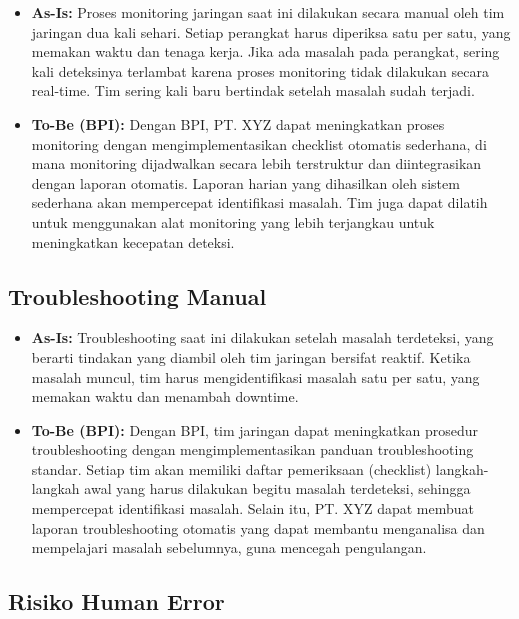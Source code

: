 \begin{itemize}
    \item \textbf{As-Is:} Proses monitoring jaringan saat ini dilakukan secara manual oleh tim jaringan dua kali sehari. Setiap perangkat harus diperiksa satu per satu, yang memakan waktu dan tenaga kerja. Jika ada masalah pada perangkat, sering kali deteksinya terlambat karena proses monitoring tidak dilakukan secara real-time. Tim sering kali baru bertindak setelah masalah sudah terjadi.

    \item \textbf{To-Be (BPI):} Dengan BPI, PT. XYZ dapat meningkatkan proses monitoring dengan mengimplementasikan checklist otomatis sederhana, di mana monitoring dijadwalkan secara lebih terstruktur dan diintegrasikan dengan laporan otomatis. Laporan harian yang dihasilkan oleh sistem sederhana akan mempercepat identifikasi masalah. Tim juga dapat dilatih untuk menggunakan alat monitoring yang lebih terjangkau untuk meningkatkan kecepatan deteksi.
\end{itemize}

\subsection{Troubleshooting Manual}

\begin{itemize}
    \item \textbf{As-Is:} Troubleshooting saat ini dilakukan setelah masalah terdeteksi, yang berarti tindakan yang diambil oleh tim jaringan bersifat reaktif. Ketika masalah muncul, tim harus mengidentifikasi masalah satu per satu, yang memakan waktu dan menambah downtime.

    \item \textbf{To-Be (BPI):} Dengan BPI, tim jaringan dapat meningkatkan prosedur troubleshooting dengan mengimplementasikan panduan troubleshooting standar. Setiap tim akan memiliki daftar pemeriksaan (checklist) langkah-langkah awal yang harus dilakukan begitu masalah terdeteksi, sehingga mempercepat identifikasi masalah. Selain itu, PT. XYZ dapat membuat laporan troubleshooting otomatis yang dapat membantu menganalisa dan mempelajari masalah sebelumnya, guna mencegah pengulangan.
\end{itemize}

\subsection{Risiko Human Error}


